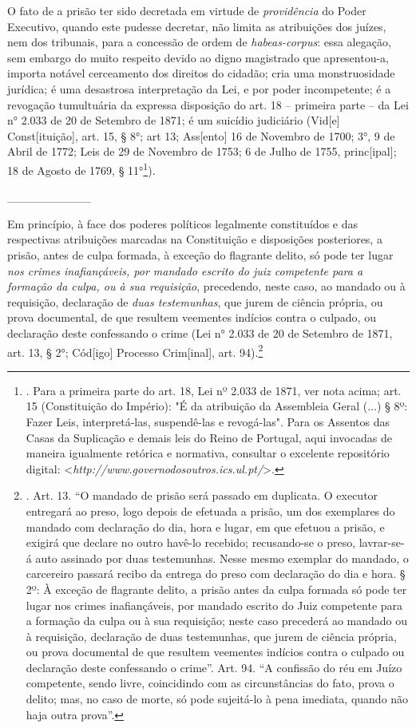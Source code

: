 O fato de a prisão ter sido decretada em virtude de \emph{providência}
do Poder Executivo, quando este pudesse decretar, não limita as
atribuições dos juízes, nem dos tribunais, para a concessão de ordem de
\emph{habeas-corpus}: essa alegação, sem embargo do muito respeito
devido ao digno magistrado que apresentou-a, importa notável cerceamento
dos direitos do cidadão; cria uma monstruosidade jurídica; é uma
desastrosa interpretação da Lei, e por poder incompetente; é a revogação
tumultuária da expressa disposição do art. 18 -- primeira parte -- da
Lei n° 2.033 de 20 de Setembro de 1871; é um suicídio judiciário
(Vid{[}e{]} Const{[}ituição{]}, art. 15, § 8°; art 13; Ass{[}ento{]} 16
de Novembro de 1700; 3°, 9 de Abril de 1772; Leis de 29 de Novembro de
1753; 6 de Julho de 1755, princ{[}ipal{]}; 18 de Agosto de 1769, §
11°\footnote{. Para a primeira parte do art. 18, Lei nº 2.033 de 1871,
  ver nota acima; art. 15 (Constituição do Império): "É da atribuição da
  Assembleia Geral (...) § 8º: Fazer Leis, interpretá-las, suspendê-las
  e revogá-las". Para os Assentos das Casas da Suplicação e demais leis
  do Reino de Portugal, aqui invocadas de maneira igualmente retórica e
  normativa, consultar o excelente repositório digital:
  \textless{}\emph{http://www.governodosoutros.ics.ul.pt/}\textgreater{}.}).

\_\_\_\_\_\_\_\_\_\_

Em princípio, à face dos poderes políticos legalmente constituídos e das
respectivas atribuições marcadas na Constituição e disposições
posteriores, a prisão, antes de culpa formada, à exceção do flagrante
delito, só pode ter lugar \emph{nos crimes inafiançáveis, por mandado
escrito do juiz competente para a formação da culpa, ou à sua
requisição}, precedendo, neste caso, ao mandado ou à requisição,
declaração de \emph{duas testemunhas}, que jurem de ciência própria, ou
prova documental, de que resultem veementes indícios contra o culpado,
ou declaração deste confessando o crime (Lei n° 2.033 de 20 de Setembro
de 1871, art. 13, § 2°; Cód{[}igo{]} Processo Crim{[}inal{]}, art.
94).\footnote{. Art. 13. ``O mandado de prisão será passado em
  duplicata. O executor entregará ao preso, logo depois de efetuada a
  prisão, um dos exemplares do mandado com declaração do dia, hora e
  lugar, em que efetuou a prisão, e exigirá que declare no outro havê-lo
  recebido; recusando-se o preso, lavrar-se-á auto assinado por duas
  testemunhas. Nesse mesmo exemplar do mandado, o carcereiro passará
  recibo da entrega do preso com declaração do dia e hora. § 2º: À
  exceção de flagrante delito, a prisão antes da culpa formada só pode
  ter lugar nos crimes inafiançáveis, por mandado escrito do Juiz
  competente para a formação da culpa ou à sua requisição; neste caso
  precederá ao mandado ou à requisição, declaração de duas testemunhas,
  que jurem de ciência própria, ou prova documental de que resultem
  veementes indícios contra o culpado ou declaração deste confessando o
  crime''. Art. 94. ``A confissão do réu em Juízo competente, sendo
  livre, coincidindo com as circunstâncias do fato, prova o delito; mas,
  no caso de morte, só pode sujeitá-lo à pena imediata, quando não haja
  outra prova''.}

